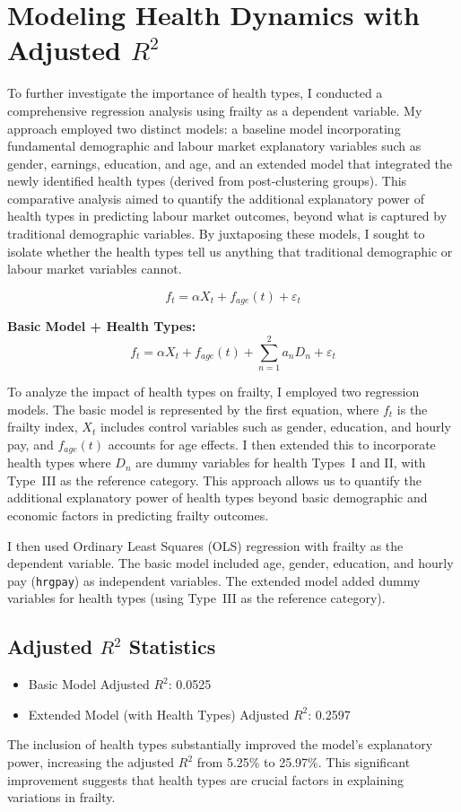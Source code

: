 \section{Modeling Health Dynamics with Adjusted $R^2$}
To further investigate the importance of health types, I conducted a comprehensive regression analysis using frailty as a dependent variable. My approach employed two distinct models: a baseline model incorporating fundamental demographic and labour market explanatory variables such as gender, earnings, education, and age, and an extended model that integrated the newly identified health types (derived from post-clustering groups). This comparative analysis aimed to quantify the additional explanatory power of health types in predicting labour market outcomes, beyond what is captured by traditional demographic variables. By juxtaposing these models, I sought to isolate whether the health types tell us anything that traditional demographic or labour market variables cannot.

\begin{equation}
    f_t = \alpha X_t + f_{age}(t) + \varepsilon_t
\end{equation}

\textbf{Basic Model + Health Types:}
\begin{equation}
    f_t = \alpha X_t + f_{age}(t) + \sum_{n=1}^{2} a_n D_n + \varepsilon_t
\end{equation}

To analyze the impact of health types on frailty, I employed two regression models. The basic model is represented by the first equation, where $f_t$ is the frailty index, $X_t$ includes control variables such as gender, education, and hourly pay, and $f_{age}(t)$ accounts for age effects. I then extended this to incorporate health types where $D_n$ are dummy variables for health Types~I and II, with Type~III as the reference category. This approach allows us to quantify the additional explanatory power of health types beyond basic demographic and economic factors in predicting frailty outcomes.

I then used Ordinary Least Squares (OLS) regression with frailty as the dependent variable. The basic model included age, gender, education, and hourly pay (\texttt{hrgpay}) as independent variables. The extended model added dummy variables for health types (using Type~III as the reference category).

\subsection{Adjusted $R^2$ Statistics}
\begin{itemize}
    \item Basic Model Adjusted $R^2$: 0.0525
    \item Extended Model (with Health Types) Adjusted $R^2$: 0.2597
\end{itemize}
The inclusion of health types substantially improved the model's explanatory power, increasing the adjusted $R^2$ from 5.25\% to 25.97\%. This significant improvement suggests that health types are crucial factors in explaining variations in frailty.

